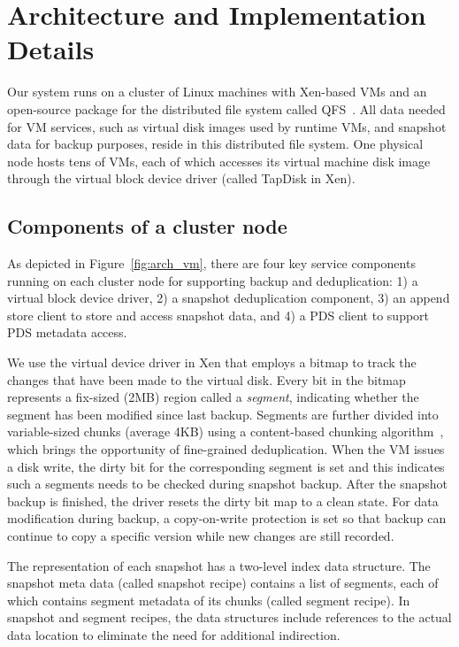 \section{Architecture and Implementation Details}
\label{sect:architecture}

Our system runs on a cluster of Linux machines with Xen-based VMs and
an open-source package for the distributed file system  called QFS~\cite{michael2013}. 
All data needed for VM services, such as virtual disk images used by runtime VMs,
and snapshot data for backup purposes, reside in this distributed file system. 
One physical node hosts tens of VMs, each of which accesses its virtual machine disk image through the
virtual block device driver (called TapDisk\cite{Warfield2005} in Xen).

\subsection{ Components of a cluster node } 
As depicted in Figure~\ref{fig:arch_vm}, 
there are four key service components running on each cluster
node  for supporting backup and deduplication: 
1) a virtual block device driver, 2) a snapshot deduplication component,
3) an append store client to store  and access snapshot data,
and 4)  a PDS client to support PDS metadata access. 

We use the virtual device driver in Xen that employs a bitmap to track the changes 
that have been made to the virtual disk.
Every bit in the bitmap represents a fix-sized (2MB) region called a \textit{segment}, indicating whether the segment
has been modified since last backup. 
Segments are further divided into variable-sized chunks (average 4KB) 
using a content-based chunking algorithm~\cite{frame05}, 
which brings the opportunity of fine-grained deduplication.
When the VM issues a disk write, the dirty bit for the corresponding segment is set
and this indicates such a segments needs to be checked during snapshot backup. 
After the snapshot backup is finished, the driver resets the dirty bit map to a clean state.
For data modification during backup, a copy-on-write protection is set so that backup can continue to
copy  a specific version while new changes are still recorded.

The representation of each snapshot has  a two-level index data structure.
The snapshot meta data (called snapshot recipe) contains a list of segments, each of which contains segment
metadata of its chunks (called segment recipe).
In snapshot and segment recipes, 
the data structures  include references to the actual data location to eliminate the need for additional indirection.

